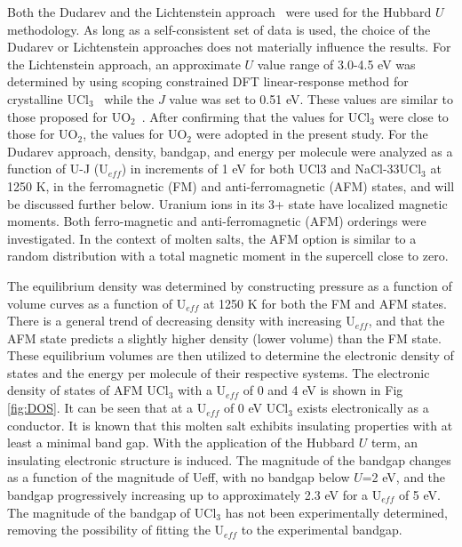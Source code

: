 \documentclass[preprint,3p,10pt,twocolumn,number,sort&compress]{elsarticle}
\begin{document}
Both the Dudarev and the Lichtenstein approach~\cite{dudarev1998} were used for the Hubbard $U$ methodology. As long as a self-consistent set of data is used, the choice of the Dudarev or Lichtenstein approaches does not materially influence the results. For the Lichtenstein approach, an approximate $U$ value range of 3.0-4.5 eV was determined by using scoping constrained DFT linear-response method for crystalline UCl$_3$~\cite{} while the $J$ value was set to 0.51 eV. These values are similar to those proposed for UO$_2$~\cite{}. After confirming that the values for UCl$_3$ were close to those for UO$_2$, the values for UO$_2$ were adopted in the present study. For the Dudarev approach, density, bandgap, and energy per molecule were analyzed as a function of U-J (U$_{eff}$) in increments of 1 eV for both UCl3 and NaCl-33UCl$_3$ at 1250 K, in the ferromagnetic (FM) and anti-ferromagnetic (AFM) states, and will be discussed further below. Uranium ions in its 3+ state have localized magnetic moments. Both ferro-magnetic and anti-ferromagnetic (AFM) orderings were investigated. In the context of molten salts, the AFM option is similar to a random distribution with a total magnetic moment in the supercell close to zero. 

The equilibrium density was determined by constructing pressure as a function of volume curves as a function of U$_{eff}$ at 1250 K for both the FM and AFM states. There is a general trend of decreasing density with increasing U$_{eff}$, and that the AFM state predicts a slightly higher density (lower volume) than the FM state. These equilibrium volumes are then utilized to determine the electronic density of states and the energy per molecule of their respective systems. The electronic density of states of AFM UCl$_3$ with a U$_{eff}$ of 0 and 4 eV is shown in Fig \ref{fig:DOS}. It can be seen that at a U$_{eff}$ of 0 eV UCl$_3$ exists electronically as a conductor. It is known that this molten salt exhibits insulating properties \cite{} with at least a minimal band gap. With the application of the Hubbard $U$ term, an insulating electronic structure is induced. The magnitude of the bandgap changes as a function of the magnitude of Ueff, with no bandgap below $U$=2 eV, and the bandgap progressively increasing up to approximately 2.3 eV for a U$_{eff}$ of 5 eV. The magnitude of the bandgap of UCl$_3$ has not been experimentally determined, removing the possibility of fitting the U$_{eff}$ to the experimental bandgap. 
\end{document}
